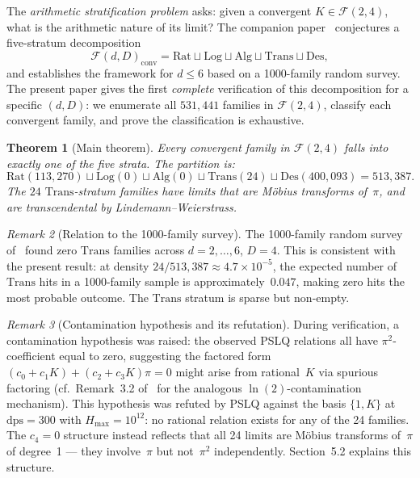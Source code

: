 \documentclass[12pt, reqno]{amsart}
\newtheorem{theorem}{Theorem}[section]
\theoremstyle{definition}
\theoremstyle{remark}
\newtheorem{remark}[theorem]{Remark}
\newcommand{\Rat}{\mathrm{Rat}}
\newcommand{\Log}{\mathrm{Log}}
\newcommand{\Alg}{\mathrm{Alg}}
\newcommand{\Trans}{\mathrm{Trans}}
\newcommand{\Des}{\mathrm{Des}}
\begin{document}
The \emph{arithmetic stratification problem} asks: given a convergent $K \in \mathcal{F}(2,4)$,
what is the arithmetic nature of its limit? The companion paper~\cite{logladder}
conjectures a five-stratum decomposition
\[
  \mathcal{F}(d,D)_{\mathrm{conv}} = \Rat \sqcup \Log \sqcup \Alg \sqcup \Trans \sqcup \Des,
\]
and establishes the framework for $d \le 6$ based on a 1000-family random survey.
The present paper gives the first \emph{complete} verification of this decomposition
for a specific $(d, D)$: we enumerate all $531{,}441$ families in $\mathcal{F}(2,4)$, classify
each convergent family, and prove the classification is exhaustive.

\begin{theorem}[Main theorem]\label{thm:main}
Every convergent family in $\mathcal{F}(2,4)$ falls into exactly one of
the five strata. The partition is:
\[
  \Rat(113{,}270) \sqcup \Log(0) \sqcup \Alg(0) \sqcup \Trans(24) \sqcup \Des(400{,}093) = 513{,}387.
\]
The $24$ $\Trans$-stratum families have limits that are M\"obius transforms of~$\pi$,
and are transcendental by Lindemann--Weierstrass.
\end{theorem}

\begin{remark}[Relation to the 1000-family survey]\label{rem:survey}
The 1000-family random
survey of~\cite{logladder} found zero $\Trans$ families across $d=2,\dots,6$, $D=4$.
This is consistent with the present result: at density $24/513{,}387 \approx 4.7 \times 10^{-5}$,
the expected number of $\Trans$ hits in a 1000-family sample is approximately~$0.047$,
making zero hits the most probable outcome. The $\Trans$ stratum is sparse but
non-empty.
\end{remark}

\begin{remark}[Contamination hypothesis and its refutation]\label{rem:contam}
During verification,
a contamination hypothesis was raised: the observed PSLQ relations all have
$\pi^2$-coefficient equal to zero, suggesting the factored form
$(c_0 + c_1 K) + (c_2 + c_3 K)\pi = 0$ might arise from rational~$K$ via
spurious factoring (cf.\ Remark~3.2 of~\cite{logladder} for the analogous
$\ln(2)$-contamination mechanism). This hypothesis was refuted by PSLQ against
the basis $\{1, K\}$ at $\mathrm{dps}=300$ with $H_{\max}=10^{12}$: no rational relation exists
for any of the 24 families. The $c_4=0$ structure instead reflects that all
24 limits are M\"obius transforms of~$\pi$ of degree~1 --- they involve~$\pi$ but
not~$\pi^2$ independently. Section~5.2 explains this structure.
\end{remark}
\end{document}
